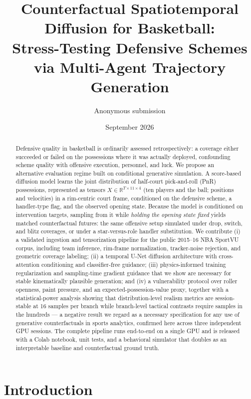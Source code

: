 \documentclass[11pt]{article}
\title{\bf Counterfactual Spatiotemporal Diffusion for Basketball:\\[2pt]
\large Stress-Testing Defensive Schemes via Multi-Agent Trajectory Generation}
\author{Anonymous submission}
\date{September 2026}
\newcommand{\R}{\mathbb{R}}
\begin{document}
\maketitle

\begin{abstract}
Defensive quality in basketball is ordinarily assessed retrospectively: a
coverage either succeeded or failed on the possessions where it was actually
deployed, confounding scheme quality with offensive execution, personnel, and
luck. We propose an alternative evaluation regime built on conditional
generative simulation. A score-based diffusion model learns the joint
distribution of half-court pick-and-roll (PnR) possessions, represented as
tensors $X \in \R^{T \times 11 \times 4}$ (ten players and the ball; positions
and velocities) in a rim-centric court frame, conditioned on the defensive
scheme, a handler-type flag, and the observed opening state. Because the model
is conditioned on intervention targets, sampling from it while \emph{holding
the opening state fixed} yields matched counterfactual futures: the same
offensive setup simulated under drop, switch, and blitz coverages, or under a
star-versus-role handler substitution. We contribute (i) a validated ingestion
and tensorization pipeline for the public 2015--16 NBA SportVU corpus,
including team inference, rim-frame normalization, tracker-noise rejection,
and geometric coverage labeling; (ii) a temporal U-Net diffusion architecture
with cross-attention conditioning and classifier-free guidance; (iii)
physics-informed training regularization and sampling-time gradient guidance
that we show are necessary for stable kinematically plausible generation; and
(iv) a vulnerability protocol over roller openness, paint pressure, and an
expected-possession-value proxy, together with a statistical-power analysis
showing that distribution-level realism metrics are session-stable at 16
samples per branch while branch-level tactical contrasts require samples in
the hundreds --- a negative result we regard as a necessary specification for
any use of generative counterfactuals in sports analytics, confirmed here
across three independent GPU sessions. The complete
pipeline runs end-to-end on a single GPU and is released with a Colab
notebook, unit tests, and a behavioral simulator that doubles as an
interpretable baseline and counterfactual ground truth.
\end{abstract}

\section{Introduction}
\label{sec:intro}
\end{document}
